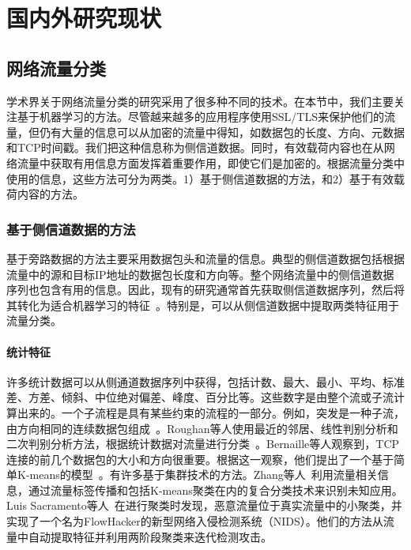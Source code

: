 \documentclass[degree=master,cjk-font=noto]{thuthesis}
\begin{document}
\chapter{国内外研究现状}

\section{网络流量分类}

学术界关于网络流量分类的研究采用了很多种不同的技术。在本节中，我们主要关注基于机器学习的方法。尽管越来越多的应用程序使用SSL/TLS来保护他们的流量，但仍有大量的信息可以从加密的流量中得知，如数据包的长度、方向、元数据和TCP时间戳。我们把这种信息称为侧信道数据。同时，有效载荷内容也在从网络流量中获取有用信息方面发挥着重要作用，即使它们是加密的。根据流量分类中使用的信息，这些方法可分为两类。1）基于侧信道数据的方法，和2）基于有效载荷内容的方法。

\subsection{基于侧信道数据的方法}


基于旁路数据的方法主要采用数据包头和流量的信息。典型的侧信道数据包括根据流量中的源和目标IP地址的数据包长度和方向等。整个网络流量中的侧信道数据序列也包含有用的信息。因此，现有的研究通常首先获取侧信道数据序列，然后将其转化为适合机器学习的特征~\cite{app_class}。特别是，可以从侧信道数据中提取两类特征用于流量分类。

\subsubsection{统计特征}


许多统计数据可以从侧通道数据序列中获得，包括计数、最大、最小、平均、标准差、方差、倾斜、中位绝对偏差、峰度、百分比等。这些数字是由整个流或子流计算出来的。一个子流程是具有某些约束的流程的一部分。例如，突发是一种子流，由方向相同的连续数据包组成~\cite{SSFW10}。Roughan等人使用最近的邻居、线性判别分析和二次判别分析方法，根据统计数据对流量进行分类~\cite{b11}。Bernaille等人观察到，TCP连接的前几个数据包的大小和方向很重要。根据这一观察，他们提出了一个基于简单K-means的模型~\cite{b12}。有许多基于集群技术的方法。Zhang等人~\cite{b15}利用流量相关信息，通过流量标签传播和包括K-means聚类在内的复合分类技术来识别未知应用。Luis Sacramento等人~\cite{flowhacker}在进行聚类时发现，恶意流量位于真实流量中的小聚类，并实现了一个名为FlowHacker的新型网络入侵检测系统（NIDS）。他们的方法从流量中自动提取特征并利用两阶段聚类来迭代检测攻击。
\end{document}
